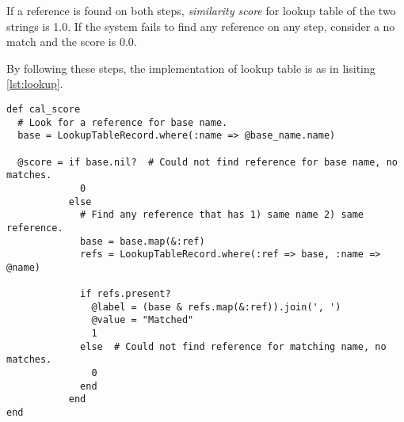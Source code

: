 If a reference is found on both steps, \emph{similarity score} for lookup table
of the two strings is 1.0. If the system fails to find any reference on
any step, consider a no match and the score is 0.0.

By following these steps, the implementation of lookup table
is as in lisiting \ref{lst:lookup}.

\begin{minipage}{\linewidth}
\begin{lstlisting}[label={lst:lookup}, caption={Lookup table implementation.}]
def cal_score
  # Look for a reference for base name.
  base = LookupTableRecord.where(:name => @base_name.name)

  @score = if base.nil?  # Could not find reference for base name, no matches.
             0
           else
             # Find any reference that has 1) same name 2) same reference.
             base = base.map(&:ref)
             refs = LookupTableRecord.where(:ref => base, :name => @name)

             if refs.present?
               @label = (base & refs.map(&:ref)).join(', ')
               @value = "Matched"
               1
             else  # Could not find reference for matching name, no matches.
               0
             end
           end
end
\end{lstlisting}
\end{minipage}
